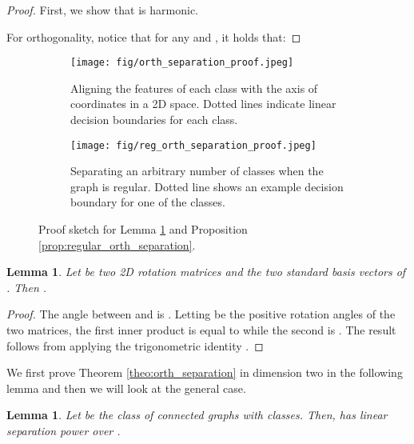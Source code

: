 \documentclass{article}
\newtheorem{lemma}[theorem]{Lemma}
\begin{document}
\begin{proof}
First, we show that  is harmonic. 

For orthogonality, notice that for any  and , it holds that:

\end{proof}

\begin{figure}
    \centering
    \begin{subfigure}[b]{0.3\textwidth}
        \centering
        \texttt{[image: fig/orth\_separation\_proof.jpeg]}
        \caption{Aligning the features of each class with the axis of coordinates in a 2D space. Dotted lines indicate linear decision boundaries for each class.}
        \label{fig:orth_separation_proof}
    \end{subfigure}
    \hspace{40pt}
    \begin{subfigure}[b]{0.3\textwidth}
        \centering
        \texttt{[image: fig/reg\_orth\_separation\_proof.jpeg]}
        \caption{Separating an arbitrary number of classes when the graph is regular. Dotted line shows an example decision boundary for one of the classes.}
        \label{fig:reg_orth_separation_proof}
    \end{subfigure}
    \caption{Proof sketch for Lemma \ref{lemma:orth_separation_d2} and Proposition \ref{prop:regular_orth_separation}.}
    \label{fig:orth_separation_all_proofs}
\end{figure}

\begin{lemma}\label{lemma:swap_rotations}
Let  be two 2D rotation matrices and  the two standard basis vectors of . Then .
\end{lemma}

\begin{proof}
The angle between  and  is . Letting  be the positive rotation angles of the two matrices, the first inner product is equal to  while the second is . The result follows from applying the trigonometric identity .  
\end{proof}

We first prove Theorem \ref{theo:orth_separation} in dimension two in the following lemma and then we will look at the general case. 

\begin{lemma}\label{lemma:orth_separation_d2}
Let  be the class of connected graphs with  classes. Then,  has linear separation power over .  
\end{lemma}
\end{document}
